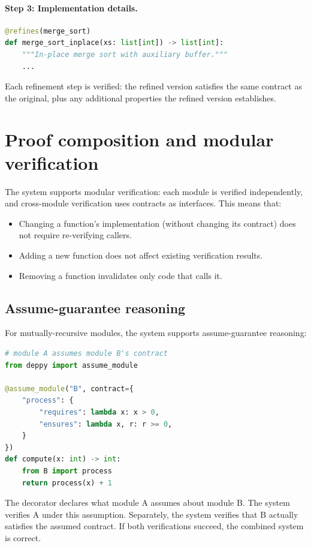 \documentclass[11pt]{report}
\DeclareRobustCommand{\py}[1]{\texttt{\detokenize{#1}}}
\theoremstyle{definition}
\theoremstyle{plain}
\begin{document}
\paragraph{Step 3: Implementation details.}
\begin{lstlisting}[style=deppy,language=Python]
@refines(merge_sort)
def merge_sort_inplace(xs: list[int]) -> list[int]:
    """In-place merge sort with auxiliary buffer."""
    ...
\end{lstlisting}

Each refinement step is verified: the refined version satisfies the same
contract as the original, plus any additional properties the refined version
establishes.

\section{Proof composition and modular verification}

The system supports modular verification: each module is verified
independently, and cross-module verification uses contracts as interfaces.
This means that:

\begin{itemize}[nosep]
  \item Changing a function's implementation (without changing its contract)
        does not require re-verifying callers.
  \item Adding a new function does not affect existing verification results.
  \item Removing a function invalidates only code that calls it.
\end{itemize}

\subsection{Assume-guarantee reasoning}

For mutually-recursive modules, the system supports assume-guarantee
reasoning:

\begin{lstlisting}[style=deppy,language=Python]
# module A assumes module B's contract
from deppy import assume_module

@assume_module("B", contract={
    "process": {
        "requires": lambda x: x > 0,
        "ensures": lambda x, r: r >= 0,
    }
})
def compute(x: int) -> int:
    from B import process
    return process(x) + 1
\end{lstlisting}

The \py{@assume_module} decorator declares what module A assumes about
module B. The system verifies A under this assumption. Separately, the
system verifies that B actually satisfies the assumed contract. If both
verifications succeed, the combined system is correct.
\end{document}

